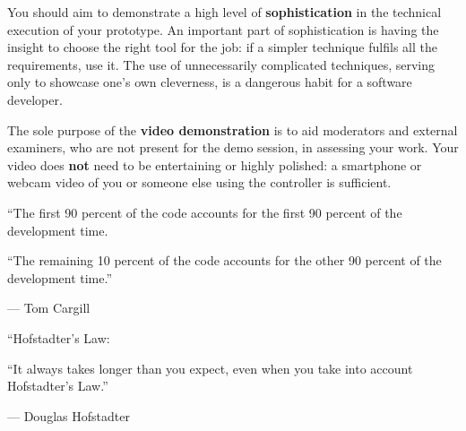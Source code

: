 \documentclass{../fal_assignment}
\begin{document}
You should aim to demonstrate a high level of \textbf{sophistication}
in the technical execution of your prototype.
An important part of sophistication is having the insight to choose the right tool for the job:
if a simpler technique fulfils all the requirements, use it.
The use of unnecessarily complicated techniques, serving only to showcase one's own cleverness,
is a dangerous habit for a software developer.

The sole purpose of the \textbf{video demonstration} is to aid moderators and external examiners,
who are not present for the demo session,
in assessing your work.
Your video does \textbf{not} need to be entertaining or highly polished:
a smartphone or webcam video of you or someone else using the controller is sufficient.

%

\begin{marginquote}
    ``The first 90 percent of the code accounts for the first 90 percent of the development time.
    
    ``The remaining 10 percent of the code accounts for the other 90 percent of the development time.''
    
    --- Tom Cargill
    
    \marginquoterule
    
    ``Hofstadter's Law:
    
    ``It always takes longer than you expect, even when you take into account Hofstadter's Law.''
    
    --- Douglas Hofstadter
\end{marginquote}
\end{document}
